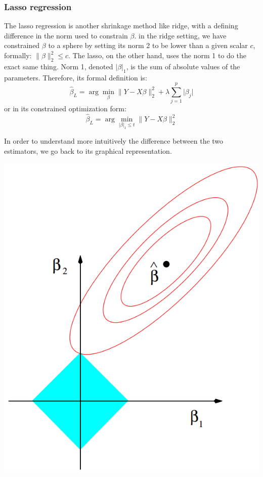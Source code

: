 \documentclass[12pt]{report}
\begin{document}
\subsubsection{Lasso regression}

The lasso regression is another shrinkage method like ridge, with a defining difference in the norm used to constrain $\beta$. in the ridge setting, we have constrained $\beta$ to a sphere by setting its norm 2 to be lower than a given scalar $c$, formally: $\lVert \beta\rVert_2^2 \leq c$. The lasso, on the other hand, uses the norm 1 to do the exact same thing. Norm 1, denoted $\lvert \beta\rvert_1$, is the sum of absolute values of the parameters. Therefore, its formal definition is: 
$$\hat\beta_L = \arg\min_\beta \lVert Y - X\beta \rVert_2^2 + \lambda\sum_{j=1}^p\lvert\beta_j\rvert $$ or in its constrained optimization form: 
$$\hat\beta_L = \arg\min_{\lvert \beta\rvert_1\leq t} \lVert Y - X\beta \rVert_2^2 $$

In order to understand more intuitively the difference between the two estimators, we go back to its graphical representation.
\begin{center}
\includegraphics[scale=0.5]{images/lassograph.PNG} 
\end{center}
\end{document}
